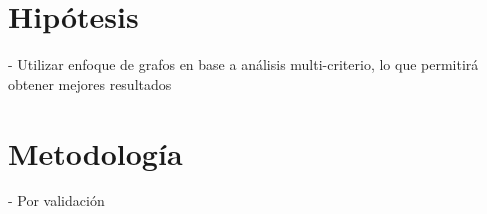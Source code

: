 \documentclass{article}
\begin{document}
\section{Hipótesis}
 - Utilizar enfoque de grafos en base a an\'alisis multi-criterio, lo que permitir\'a obtener mejores resultados

\section{Metodolog\'ia}

- Por validaci\'on



\end{document}
